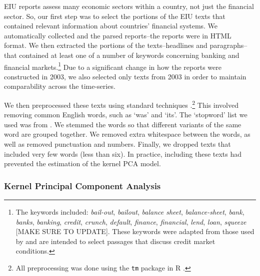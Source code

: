 \documentclass[]{article}
\begin{document}
EIU reports assess many economic sectors within a country,
not just the financial sector. So, our first step was to select the
portions of the EIU texts that contained relevant information about
countries' financial systems. We automatically collected and the parsed
reports--the reports were in HTML format. We then extracted the portions
of the texts--headlines and paragraphs--that contained at least one of a
number of keywords concerning banking and financial markets.\footnote{The
  keywords included: \emph{bail-out}, \emph{bailout}, \emph{balance
  sheet}, \emph{balance-sheet}, \emph{bank}, \emph{banks},
  \emph{banking}, \emph{credit}, \emph{crunch}, \emph{default},
  \emph{finance}, \emph{financial}, \emph{lend}, \emph{loan},
  \emph{squeeze} {[}MAKE SURE TO UPDATE{]}. These keywords were adapted
  from those used by \cite{Romer2015} and are intended to
  select passages that discuss credit market conditions.} Due to a
significant change in how the reports were constructed in 2003, we also
selected only texts from 2003 in order to maintain comparability across
the time-series.

We then preprocessed these texts using standard techniques \citep[see][]{Grimmer2013}.\footnote{All preprocessing was done using the \texttt{tm} package \citep{tm2015} in R \citep{R-cite}.} This involved removing common English words, such as `was' and `its'. The `stopword' list we used was from \cite{dhillon:modha:mlj01}. We stemmed the words so that different variants of the same word are grouped together. We removed extra whitespace between the words, as well as removed punctuation and numbers. Finally, we dropped texts that included very few words (less than six). In practice, including these texts had prevented the estimation of the kernel PCA model.

\subsubsection{Kernel Principal Component
Analysis}\label{kernel-principal-component-analysis}
\end{document}
